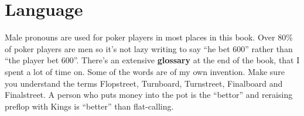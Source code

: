 \section*{Language}

Male pronouns are used for poker players in most places in this
book. Over 80\% of poker players are men so it's not lazy writing
to say ``he bet 600'' rather than ``the player bet 600''. There's an
extensive \textbf{glossary} at the end of the book, that I spent a lot
of time on. Some of the words are of my own invention. Make sure you
understand the terms Flopstreet, Turnboard, Turnstreet, Finalboard and
Finalstreet. A person who puts money into the pot is the ``bettor''
and reraising preflop with Kings is ``better'' than flat-calling.
